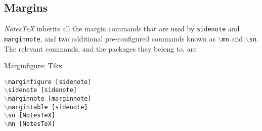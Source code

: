 \documentclass[10pt]{article}
\begin{document}
	\subsection{Margins}%
	\textit{NotesTeX} inherits all the margin commands that are used by \texttt{sidenote} and \texttt{marginnote}, and two additional pre-configured commands known as \texttt{$\backslash$mn} and \texttt{$\backslash$sn}. The relevant commands, and the packages they belong to, are
	\begin{marginfigure}
		\begin{center}
		\end{center}
		\caption{Marginfigure: Tikz}
	\end{marginfigure}%
	\begin{center}
		\begin{multicols}{2}
		\noindent\texttt{$\backslash$marginfigure~[sidenote]\\
		$\backslash$sidenote~[sidenote]\\
		$\backslash$marginnote~[marginnote]\\
		$\backslash$margintable~[sidenote]\\
		$\backslash$sn~[NotesTeX]\\
		$\backslash$mn~[NotesTeX]\\
		}
	\end{multicols}
	\end{center}
\end{document}
